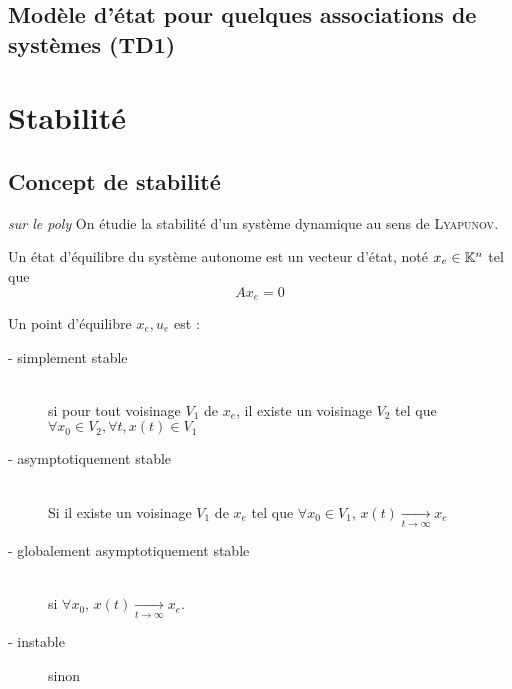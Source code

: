 \documentclass[main.tex]{subfiles}
\begin{document}
\subsection{Modèle d'état pour quelques associations de systèmes (TD1)}
\newpage
\section{Stabilité}

\subsection{Concept de stabilité}
\emph{sur le poly}
On étudie la stabilité d'un système dynamique au sens de \textsc{Lyapunov}.

\begin{defin}
  Un état d'équilibre du système autonome est un vecteur d'état, noté $x_e\in \mathbb{K}^n$ tel que
  \[
    A x_e =0
  \]
\end{defin}


\begin{defin}
  Un point d'équilibre $x_e,u_e$ est :
  \begin{description}
  \item[ - simplement stable] ~\\
    si pour tout voisinage $V_1$ de $x_e$, il existe un voisinage $V_2$ tel que $\forall x_0 \in V_2, \forall t, x(t) \in V_1 $
  \item[- asymptotiquement stable]~\\
    Si il existe un voisinage $V_1$ de $x_e$ tel que $\forall x_0 \in V_1$, $x(t)\xrightarrow[t\to\infty]{} x_e$
  \item[- globalement asymptotiquement stable] ~\\
    si $\forall x_0$, $x(t)\xrightarrow[t\to\infty]{} x_e$.
  \item[- instable] sinon
  \end{description}
\end{defin}
\end{document}
